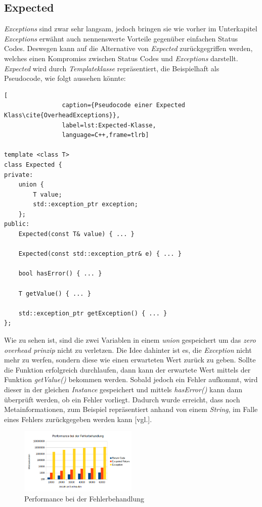 \subsection{Expected}
\emph{Exceptions} sind zwar sehr langsam, jedoch bringen sie wie vorher im Unterkapitel \emph{Exceptions} erwähnt auch nennenswerte Vorteile gegenüber einfachen Status Codes. Deswegen kann auf die Alternative von \emph{Expected} zurückgegriffen werden, welches einen Kompromiss zwischen Status Codes und \emph{Exceptions} darstellt. \emph{Expected} wird durch \emph{Templateklasse} repräsentiert, die Beispielhaft als Pseudocode, wie folgt aussehen könnte:
\newpage

\begin{lstlisting}[
  				caption={Pseudocode einer Expected Klass\cite{OverheadExceptions}},
  				label=lst:Expected-Klasse,
  				language=C++,frame=tlrb]
  				
template <class T>
class Expected {
private:
    union {
        T value;
        std::exception_ptr exception;
    };
public:
    Expected(const T& value) { ... }
    
    Expected(const std::exception_ptr& e) { ... }
    
    bool hasError() { ... }
    
    T getValue() { ... }
    
    std::exception_ptr getException() { ... }
};
			\end{lstlisting}
			
Wie zu sehen ist, sind die zwei Variablen in einem \emph{union} gespeichert um das \emph{zero overhead prinzip} nicht zu verletzen. Die Idee dahinter ist es, die \emph{Exception} nicht mehr zu werfen, sondern diese wie einen erwarteten Wert zurück zu geben. Sollte die Funktion erfolgreich durchlaufen, dann kann der erwartete Wert mittels der Funktion \emph{getValue()} bekommen werden. Sobald  jedoch ein Fehler aufkommt, wird dieser in der gleichen \emph{Instance} gespeichert und mittels \emph{hasError()} kann dann überprüft werden, ob ein Fehler vorliegt. Dadurch wurde erreicht, dass noch Metainformationen, zum Beispiel repräsentiert anhand von einem \emph{String}, im Falle eines Fehlers zurückgegeben werden kann \cite{OverheadExceptions}[vgl.].
\newline

\begin{figure}[h]
    \centering
    \includegraphics[width=0.5\textwidth]{bilder/Performance_Fehlerbehandlung}
    \caption[Fehlerbehandlung]{Performance bei der Fehlerbehandlung}
     \label{img:fehlerbehandlung}
 \end{figure}
 
